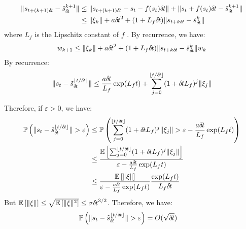 \begin{align}
  \|s_{t+(k+1){\delta\hspace{-.1em}t}} - \tilde{s}_{\delta\hspace{-.1em}t}^{k+1}\| &\leq
                                                     \|s_{t+(k+1){\delta\hspace{-.1em}t}} - s_t - f(s_t){\delta\hspace{-.1em}t}\| + \|s_t + f(s_t){\delta\hspace{-.1em}t} - \tilde{s}_{\delta\hspace{-.1em}t}^{k+1}\|\\
  &\leq \|\xi_k\| + a{\delta\hspace{-.1em}t}^2 + (1+L_f{\delta\hspace{-.1em}t})\|s_{t+k{\delta\hspace{-.1em}t}} - \tilde{s}_{\delta\hspace{-.1em}t}^{k}\|
\end{align}
where $L_f$ is the Lipschitz constant of $f$ .
By recurrence, we have:
\begin{align}
  w_{k+1} \leq \|\xi_k\| + a{\delta\hspace{-.1em}t}^2 + (1+L_f{\delta\hspace{-.1em}t})\|s_{t+k{\delta\hspace{-.1em}t}} - \tilde{s}_{\delta\hspace{-.1em}t}^{k}\|w_k
\end{align}
By recurrence:
\begin{align}
  \|s_{t} - \tilde{s}_{\delta\hspace{-.1em}t}^{\lfloor t/{\delta\hspace{-.1em}t} \rfloor} \| \leq \frac{a{\delta\hspace{-.1em}t}}{L_f}\exp(L_ft) + \sum_{j=0}^{\lfloor t/{\delta\hspace{-.1em}t} \rfloor}(1+{\delta\hspace{-.1em}t} L_f)^j\|\xi_j\|  
\end{align}

Therefore, if $\varepsilon >0$, we have:
\begin{align}
  \mathbb{P}\left(\|s_{t} - \tilde{s}_{\delta\hspace{-.1em}t}^{\lfloor t/{\delta\hspace{-.1em}t} \rfloor} \| > \varepsilon \right) &\leq \mathbb{P}\left(\sum_{j=0}^{\lfloor t/{\delta\hspace{-.1em}t} \rfloor}(1+{\delta\hspace{-.1em}t} L_f)^j\|\xi_j\| > \varepsilon - \frac{a{\delta\hspace{-.1em}t}}{L_f}\exp(L_ft)\right) \\
                                                                                            &\leq \frac{\mathbb{E}\left[\sum_{j=0}^{\lfloor t/{\delta\hspace{-.1em}t} \rfloor}(1+{\delta\hspace{-.1em}t} L_f)^j\|\xi_j\|\right]}{\varepsilon - \frac{a{\delta\hspace{-.1em}t}}{L_f}\exp(L_ft)}\\
                                                                                            &\leq \frac{\mathbb{E}\left[\|\xi\|\right]}{\varepsilon - \frac{a{\delta\hspace{-.1em}t}}{L_f}\exp(L_ft)}\frac{\exp(L_ft)}{L_f{\delta\hspace{-.1em}t}}\\
\end{align}
But $\mathbb{E}\left[\|\xi\|\right] \leq \sqrt{\mathbb{E}\left[\|\xi\|^2\right]} \leq \sigma {\delta\hspace{-.1em}t}^{3/2}$. Therefore, we have:
\begin{align}
  \mathbb{P}\left(\|s_{t} - \tilde{s}_{\delta\hspace{-.1em}t}^{\lfloor t/{\delta\hspace{-.1em}t} \rfloor} \| > \varepsilon \right) & = O(\sqrt {{\delta\hspace{-.1em}t}})
\end{align}

